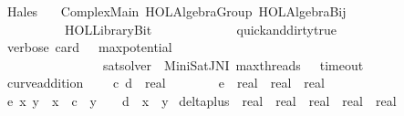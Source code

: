 %
\begin{isabellebody}%
%
%
\isadelimtheory
%
\endisadelimtheory
%
\isatagtheory
{}\isamarkupfalse%
\ Hales\isanewline
\ \ \ Complex{\isacharunderscore}Main\ {\isachardoublequoteopen}HOL{\isacharminus}Algebra{\isachardot}Group{\isachardoublequoteclose}\ {\isachardoublequoteopen}HOL{\isacharminus}Algebra{\isachardot}Bij{\isachardoublequoteclose}\isanewline
\ \ \ \ \ \ \ \ \ \ {\isachardoublequoteopen}HOL{\isacharminus}Library{\isachardot}Bit{\isachardoublequoteclose}\ \isanewline
\ \ \ \ \ \ \ \ \ \ \isanewline
{}%
\endisatagtheory
{\isafoldtheory}%
%
\isadelimtheory
\isanewline
%
\endisadelimtheory
{}\isamarkupfalse%
\ {\isacharbrackleft}{\isacharbrackleft}quick{\isacharunderscore}and{\isacharunderscore}dirty{\isacharequal}true{\isacharbrackright}{\isacharbrackright}\isanewline
\isanewline
{}\isamarkupfalse%
\ {\isacharbrackleft}verbose{\isacharcomma}\ card\ {\isacharequal}\ {}{\isacharminus}{}{}{\isacharcomma}\ max{\isacharunderscore}potential\ {\isacharequal}\ {}{\isacharcomma}\isanewline
\ \ \ \ \ \ \ \ \ \ \ \ \ \ \ \ sat{\isacharunderscore}solver\ {\isacharequal}\ MiniSat{\isacharunderscore}JNI{\isacharcomma}\ max{\isacharunderscore}threads\ {\isacharequal}\ {}{\isacharcomma}\ timeout\ {\isacharequal}\ {}{}{}{\isacharbrackright}%
\isadelimdocument
%
\endisadelimdocument
%
\isatagdocument
%
\isamarkuptrue%
%
\endisatagdocument
{\isafolddocument}%
%
\isadelimdocument
%
\endisadelimdocument
{}\isamarkupfalse%
\ curve{\isacharunderscore}addition\ {\isacharequal}\isanewline
\ \ \ c\ d\ {\isacharcolon}{\isacharcolon}\ real\isanewline
{}\ \ \ \ \ \ \isanewline
\isanewline
{}\isamarkupfalse%
\ e\ {\isacharcolon}{\isacharcolon}\ {\isachardoublequoteopen}real\ {\isasymRightarrow}\ real\ {\isasymRightarrow}\ real{\isachardoublequoteclose}\ \isanewline
\ {\isachardoublequoteopen}e\ x\ y\ {\isacharequal}\ x{\isacharcircum}{}\ {\isacharplus}\ c\ {\isacharasterisk}\ y{\isacharcircum}{}\ {\isacharminus}\ {}\ {\isacharminus}\ d\ {\isacharasterisk}\ x{\isacharcircum}{}\ {\isacharasterisk}\ y{\isacharcircum}{}{\isachardoublequoteclose}\isanewline
\isanewline
{}\isamarkupfalse%
\ delta{\isacharunderscore}plus\ {\isacharcolon}{\isacharcolon}\ {\isachardoublequoteopen}real\ {\isasymRightarrow}\ real\ {\isasymRightarrow}\ real\ {\isasymRightarrow}\ real\ {\isasymRightarrow}\ real{\isachardoublequoteclose}\ \isanewline

\end{isabellebody}

